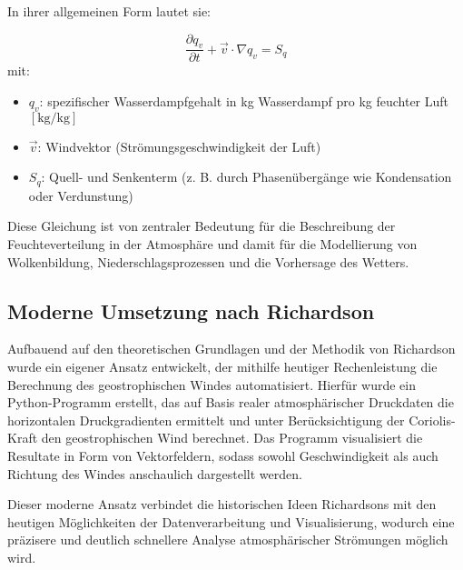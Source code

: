 In ihrer allgemeinen Form lautet sie:

\begin{equation}
\frac{\partial q_v}{\partial t} + \vec{v} \cdot \nabla q_v = S_q
\tag{19.10}
\end{equation}
mit:  
\begin{itemize}
    \item $q_v$: spezifischer Wasserdampfgehalt in kg Wasserdampf pro kg feuchter Luft $[\mathrm{kg/kg}]$
    \item $\vec{v}$: Windvektor (Strömungsgeschwindigkeit der Luft)
    \item $S_q$: Quell- und Senkenterm (z. B. durch Phasenübergänge wie Kondensation oder Verdunstung)
%
\end{itemize}

Diese Gleichung ist von zentraler Bedeutung für die Beschreibung der Feuchteverteilung in der Atmosphäre und damit für die Modellierung von Wolkenbildung, Niederschlagsprozessen und die Vorhersage des Wetters.
%
%


\subsection{Moderne Umsetzung nach Richardson} 

Aufbauend auf den theoretischen Grundlagen und der Methodik von Richardson wurde ein eigener Ansatz entwickelt, der mithilfe heutiger Rechenleistung die Berechnung des geostrophischen Windes automatisiert.
Hierfür wurde ein Python-Programm erstellt, das auf Basis realer atmosphärischer Druckdaten die horizontalen Druckgradienten ermittelt und unter Berücksichtigung der Coriolis-Kraft den geostrophischen Wind berechnet.
%
Das Programm visualisiert die Resultate in Form von Vektorfeldern, sodass sowohl Geschwindigkeit als auch Richtung des Windes anschaulich dargestellt werden.
%
%

Dieser moderne Ansatz verbindet die historischen Ideen Richardsons mit den heutigen Möglichkeiten der Datenverarbeitung und Visualisierung, wodurch eine präzisere und deutlich schnellere Analyse atmosphärischer Strömungen möglich wird.

